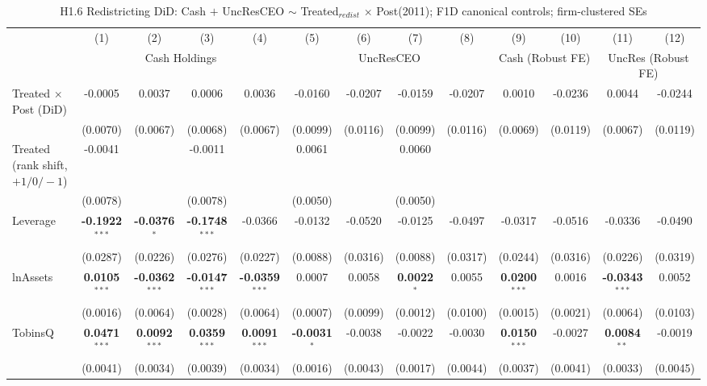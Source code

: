 \documentclass[11pt,a4paper]{article}
\begin{document}
\clearpage
\begin{table}[htbp]
\centering
\caption{H1.6 Redistricting DiD: Cash $+$ UncResCEO $\sim$ Treated$_{redist}$ $\times$ Post(2011); F1D canonical controls; firm-clustered SEs}
\label{tab:h1_6_redistricting_did}
\scriptsize
\begin{tabular}{lcccccccccccc}
\toprule
 & (1) & (2) & (3) & (4) & (5) & (6) & (7) & (8) & (9) & (10) & (11) & (12) \\
 & \multicolumn{4}{c}{Cash Holdings} & \multicolumn{4}{c}{UncResCEO} & \multicolumn{2}{c}{Cash (Robust FE)} & \multicolumn{2}{c}{UncRes (Robust FE)} \\
\cmidrule(lr){2-5} \cmidrule(lr){6-9} \cmidrule(lr){10-11} \cmidrule(lr){12-13}
\midrule
Treated $\times$ Post (DiD) & -0.0005 & 0.0037 & 0.0006 & 0.0036 & -0.0160 & -0.0207 & -0.0159 & -0.0207 & 0.0010 & -0.0236 & 0.0044 & -0.0244 \\
 & (0.0070) & (0.0067) & (0.0068) & (0.0067) & (0.0099) & (0.0116) & (0.0099) & (0.0116) & (0.0069) & (0.0119) & (0.0067) & (0.0119) \\
Treated (rank shift, $+1/0/-1$) & -0.0041 &  & -0.0011 &  & 0.0061 &  & 0.0060 &  &  &  &  &  \\
 & (0.0078) &  & (0.0078) &  & (0.0050) &  & (0.0050) &  &  &  &  &  \\
\midrule
Leverage & \textbf{-0.1922}$^{***}$ & \textbf{-0.0376}$^{*}$ & \textbf{-0.1748}$^{***}$ & -0.0366 & -0.0132 & -0.0520 & -0.0125 & -0.0497 & -0.0317 & -0.0516 & -0.0336 & -0.0490 \\
 & (0.0287) & (0.0226) & (0.0276) & (0.0227) & (0.0088) & (0.0316) & (0.0088) & (0.0317) & (0.0244) & (0.0316) & (0.0226) & (0.0319) \\
lnAssets & \textbf{0.0105}$^{***}$ & \textbf{-0.0362}$^{***}$ & \textbf{-0.0147}$^{***}$ & \textbf{-0.0359}$^{***}$ & 0.0007 & 0.0058 & \textbf{0.0022}$^{*}$ & 0.0055 & \textbf{0.0200}$^{***}$ & 0.0016 & \textbf{-0.0343}$^{***}$ & 0.0052 \\
 & (0.0016) & (0.0064) & (0.0028) & (0.0064) & (0.0007) & (0.0099) & (0.0012) & (0.0100) & (0.0015) & (0.0021) & (0.0064) & (0.0103) \\
TobinsQ & \textbf{0.0471}$^{***}$ & \textbf{0.0092}$^{***}$ & \textbf{0.0359}$^{***}$ & \textbf{0.0091}$^{***}$ & \textbf{-0.0031}$^{*}$ & -0.0038 & -0.0022 & -0.0030 & \textbf{0.0150}$^{***}$ & -0.0027 & \textbf{0.0084}$^{**}$ & -0.0019 \\
 & (0.0041) & (0.0034) & (0.0039) & (0.0034) & (0.0016) & (0.0043) & (0.0017) & (0.0044) & (0.0037) & (0.0041) & (0.0033) & (0.0045) \\

\end{tabular}
\end{table}
\end{document}
